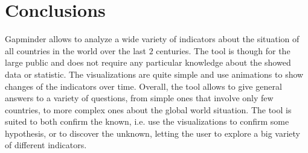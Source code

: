 \section{Conclusions}
\label{sec:conclusions}

Gapminder allows to analyze a wide variety of indicators about the situation of all countries in the world over the last $2$ centuries.
The tool is though for the large public and does not require any particular knowledge about the showed data or statistic.
The visualizations are quite simple and use animations to show changes of the indicators over time.
Overall, the tool allows to give general answers to a variety of questions, from simple ones that involve only few countries, to more complex ones about the global world situation.
The tool is suited to both confirm the known, i.e. use the visualizations to confirm some hypothesis, or to discover the unknown, letting the user to explore a big variety of different indicators.
